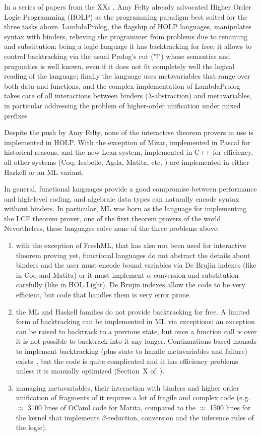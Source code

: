 \documentclass[preprint]{sigplanconf}
\begin{document}
In a series of papers from the XXs \cite{????}, Amy Felty already advocated Higher Order Logic Programming (HOLP) as the programming paradigm best suited for the three tasks above. LambdaProlog, the flagship of HOLP languages, manipulates syntax with binders, relieving the programmer from problems due to renaming and substitution; being a logic language it has backtracking for free; it allows to control backtracking via the usual Prolog's cut ("!") whose semantics and pragmatics is well known, even if it does not fit completely well the logical reading of the language; finally the language uses metavariables that range over both data and functions, and the complex implementation of LambdaProlog takes care of all interactions between binders ($\lambda$-abstraction) and metavariables, in particular addressing the problem of higher-order unification under mixed prefixes~\cite{??}.

Despite the push by Amy Felty, none of the interactive theorem provers in use is implemented in HOLP. With the exception of Mizar, implemented in Pascal for historical reasons, and the new Lean system, implemented in C++ for efficiency, all other systems (Coq, Isabelle, Agda, Matita, etc. \cite{?17thproversoftheworld??}) are implemented in either Haskell or an ML variant.

In general, functional languages provide a good compromise between performance and high-level coding, and algebraic data types can naturally encode syntax without binders. In particular, ML was born as the language for implementing the LCF theorem prover, one of the first theorem provers of the world. Nevertheless, these languages solve none of the three problems above:
\begin{enumerate}
\item with the exception of FreshML, that has also not been used for interactive theorem proving yet, functional languages do not abstract the details about binders and the user must encode bound variables via De Brujin indexes (like in Coq and Matita) or it must implement $\alpha$-conversion and substitution carefully (like in HOL Light). De Brujin indexes allow the code to be very efficient, but code that handles them is very error prone.
\item the ML and Haskell families do not provide backtracking for free. A limited form of backtracking can be implemented in ML via exceptions: an exception can be raised to backtrack to a previous state, but once a function call is over it is not possible to backtrack into it any longer. Continuations based monads to implement backtracking (plus state to handle metavariables and failure) exists~\cite{?????}, but the code is quite complicated and it has efficiency problems unless it is manually optimized (Section~X of~\cite{????}).
\item managing metavariables, their interaction with binders and higher order unification of fragments of it requires a lot of fragile and complex code (e.g. $\approx$ 3100 lines of OCaml code for Matita, compared to the $\approx$ 1500 lines for the kernel that implements $\beta$-reduction, conversion and the inference rules of the logic).
\end{enumerate}
\end{document}
